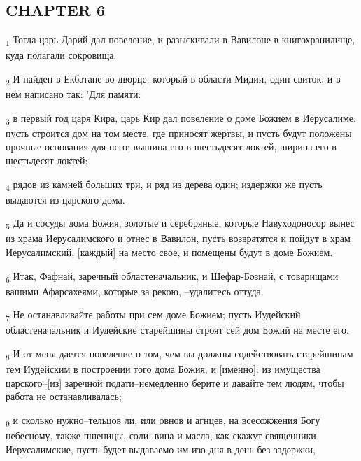 \subsection{CHAPTER 6}
\begin{tcolorbox}
\textsubscript{1} Тогда царь Дарий дал повеление, и разыскивали в Вавилоне в книгохранилище, куда полагали сокровища.
\end{tcolorbox}
\begin{tcolorbox}
\textsubscript{2} И найден в Екбатане во дворце, который в области Мидии, один свиток, и в нем написано так: 'Для памяти:
\end{tcolorbox}
\begin{tcolorbox}
\textsubscript{3} в первый год царя Кира, царь Кир дал повеление о доме Божием в Иерусалиме: пусть строится дом на том месте, где приносят жертвы, и пусть будут положены прочные основания для него; вышина его в шестьдесят локтей, ширина его в шестьдесят локтей;
\end{tcolorbox}
\begin{tcolorbox}
\textsubscript{4} рядов из камней больших три, и ряд из дерева один; издержки же пусть выдаются из царского дома.
\end{tcolorbox}
\begin{tcolorbox}
\textsubscript{5} Да и сосуды дома Божия, золотые и серебряные, которые Навуходоносор вынес из храма Иерусалимского и отнес в Вавилон, пусть возвратятся и пойдут в храм Иерусалимский, [каждый] на место свое, и помещены будут в доме Божием.
\end{tcolorbox}
\begin{tcolorbox}
\textsubscript{6} Итак, Фафнай, заречный областеначальник, и Шефар-Бознай, с товарищами вашими Афарсахеями, которые за рекою, --удалитесь оттуда.
\end{tcolorbox}
\begin{tcolorbox}
\textsubscript{7} Не останавливайте работы при сем доме Божием; пусть Иудейский областеначальник и Иудейские старейшины строят сей дом Божий на месте его.
\end{tcolorbox}
\begin{tcolorbox}
\textsubscript{8} И от меня дается повеление о том, чем вы должны содействовать старейшинам тем Иудейским в построении того дома Божия, и [именно]: из имущества царского--[из] заречной подати--немедленно берите и давайте тем людям, чтобы работа не останавливалась;
\end{tcolorbox}
\begin{tcolorbox}
\textsubscript{9} и сколько нужно--тельцов ли, или овнов и агнцев, на всесожжения Богу небесному, также пшеницы, соли, вина и масла, как скажут священники Иерусалимские, пусть будет выдаваемо им изо дня в день без задержки,
\end{tcolorbox}

